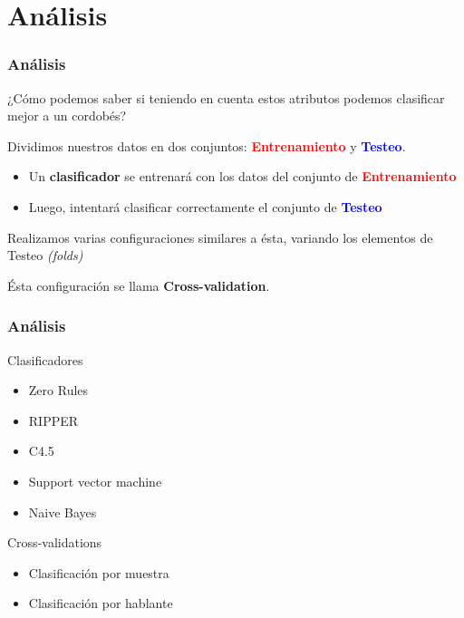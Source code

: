 \documentclass[mathserif]{beamer}%
\begin{document}
\section{Análisis}

\begin{frame}
	\frametitle{Análisis}
	
	\begin{center}
		\Large {¿Cómo podemos saber si teniendo en cuenta estos atributos podemos clasificar mejor a un cordobés?}
		
	\end{center}
	
	\pause
	
	Dividimos nuestros datos en dos conjuntos: \textcolor{red}{\textbf{Entrenamiento}} y \textcolor{blue}{\textbf{Testeo}}.
	
	\begin{itemize}
		\item Un \textbf{clasificador} se entrenará con los datos del conjunto de \textcolor{red}{\textbf{Entrenamiento}}
		\item Luego, intentará clasificar correctamente el conjunto de \textcolor{blue}{\textbf{Testeo}}
	\end{itemize}
	
	Realizamos varias configuraciones similares a ésta, variando los elementos de Testeo \textit{(folds)}
	
	Ésta configuración se llama \textbf{Cross-validation}.

\end{frame}

\begin{frame}
	\frametitle{Análisis}

	\Large {Clasificadores}
	\begin{itemize}
		\item Zero Rules
		\item RIPPER
		\item C4.5
		\item Support vector machine
		\item Naive Bayes
	\end{itemize}
	
	\Large {Cross-validations}
	\begin{itemize}
		\item Clasificación por muestra 
		\item Clasificación por hablante
	\end{itemize}
	
\end{frame}
\end{document}
